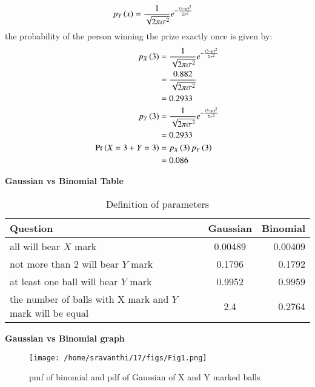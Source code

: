 \documentclass[journal,12pt,twocolumn]{IEEEtran}
\theoremstyle{remark}
\begin{document}
\begin{enumerate}[label=(\alph*)]
\begin{align}
p_Y\left(x\right) &= \frac{1}{\sqrt{2\pi{\sigma}^2}} e^{-\frac{\left(x-\mu\right)^2}{2{\sigma}^2}}
\end{align}
the probability of the person winning the prize exactly once is given by:
\begin{align}
p_X\left(3\right) &= \frac{1}{\sqrt{2\pi{\sigma}^2}} e^{-\frac{\left(3-\mu\right)^2}{2{\sigma}^2}} \\
            &=\frac{ 0.882}{\sqrt{2\pi{\sigma}^2}}\\
            &=0.2933\\
 p_Y\left(3\right) &= \frac{1}{\sqrt{2\pi{\sigma}^2}} e^{-\frac{\left(3-\mu\right)^2}{2{\sigma}^2}} \\
            &= 0.2933\\
\Pr\left(X=3 + Y=3\right)&=p_X\left(3\right)p_Y\left(3\right)\\
&=0.086
\end{align}
\end{enumerate}
\textbf{Gaussian vs Binomial Table}
\begin{table}[!ht]
\centering
\begin{tabular}{|l|c|r|}
    \hline
    Question & Gaussian & Binomial\\
    \hline
    all will bear $X$ mark & 0.00489 &0.00409\\
    \hline
   not more than 2 will bear $Y$ mark & 0.1796 & 0.1792 \\
    \hline
     at least one ball will bear $Y$ mark &  0.9952& 0.9959 \\
    \hline
    the number of balls with X mark and $Y$ mark will be equal& 2.4 & 0.2764\\
    \hline
\end{tabular}
\caption{Definition of parameters}
\label{tab:gaussian/9/3/17}
\end{table}

\textbf{Gaussian vs Binomial graph}
\begin{figure}[!ht]
\centering
\texttt{[image: /home/sravanthi/17/figs/Fig1.png]}
\caption{pmf of binomial and pdf of Gaussian of X and Y marked balls}
\end{figure}
\end{document}
